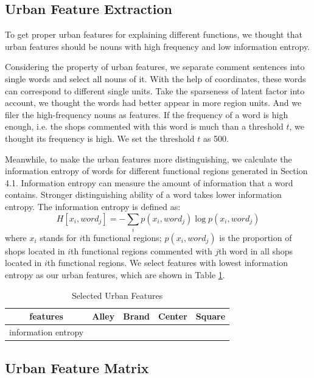 \documentclass[runningheads]{llncs}
\begin{document}
\subsection{Urban Feature Extraction}
To get proper urban features for explaining different functions, we thought that urban features should be nouns with high frequency and low information entropy.

Considering the property of urban features, we separate comment sentences into single words and select all nouns of it.
With the help of coordinates, these words can correspond to different single units.
Take the sparseness of latent factor into account, we thought the words had better appear in more region units.
And we filer the high-frequency nouns as features.
If the frequency of a word is high enough, i.e. the shops commented with this word is much than a threshold $t$, we thought its frequency is high.
We set the threshold $t$ as 500.

Meanwhile, to make the urban features more distinguishing, we calculate the information entropy of words for different functional regions generated in Section 4.1.
Information entropy can measure the amount of information that a word contains.
Stronger distinguishing ability of a word takes lower information entropy.
The information entropy is defined as:
$$H[x_i,word_j] = -\sum_i p(x_i,word_j)\log p(x_i,word_j)$$
where $x_i$ stands for $i$th functional regions;
$p(x_i,word_j)$ is the proportion of shops located in $i$th functional regions commented with $j$th word in all shops located in $i$th functional regions.
We select features with lowest information entropy as our urban features, which are shown in Table \ref{urbanfeatures}.

\begin{table}[h]
\centering
\caption{Selected Urban Features}
\label{urbanfeatures}
\begin{tabular}{c|c|c|c|c}
\hline
features &  Alley & Brand & Center & Square\\
\hline
information entropy &  &  &  & \\
\hline
\end{tabular}
\end{table}


\subsection{Urban Feature Matrix}
\end{document}
